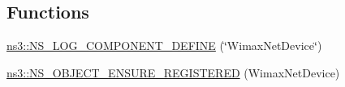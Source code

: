 \subsection*{Functions}
\begin{DoxyCompactItemize}
\item 
\hyperlink{namespacens3_ac53bdba63de3e905b3b5acd9322659c9}{ns3\+::\+N\+S\+\_\+\+L\+O\+G\+\_\+\+C\+O\+M\+P\+O\+N\+E\+N\+T\+\_\+\+D\+E\+F\+I\+NE} (\char`\"{}Wimax\+Net\+Device\char`\"{})
\item 
\hyperlink{namespacens3_a06a76c5525d608c91ae2471a49bcf880}{ns3\+::\+N\+S\+\_\+\+O\+B\+J\+E\+C\+T\+\_\+\+E\+N\+S\+U\+R\+E\+\_\+\+R\+E\+G\+I\+S\+T\+E\+R\+ED} (Wimax\+Net\+Device)
\end{DoxyCompactItemize}
